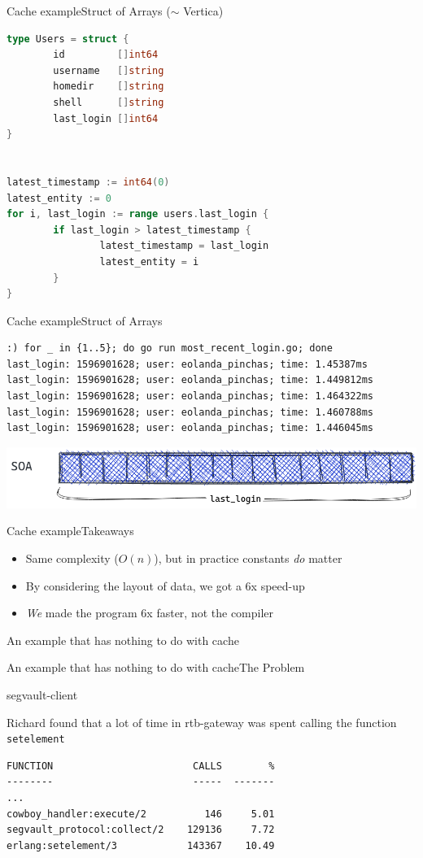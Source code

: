 \documentclass[10pt,xcolor=dvipsnames]{beamer}
\renewcommand\big[1]{
  \begin{center}
    \Large{#1}
  \end{center}
}
\begin{document}
\begin{frame}[fragile]{Cache example}{Struct of Arrays ($\sim$ Vertica)}
  \begin{lstlisting}[language = Go]
type Users = struct {
        id         []int64
        username   []string
        homedir    []string
        shell      []string
        last_login []int64
}


latest_timestamp := int64(0)
latest_entity := 0
for i, last_login := range users.last_login {
        if last_login > latest_timestamp {
                latest_timestamp = last_login
                latest_entity = i
        }
}
\end{lstlisting}
\end{frame}

\begin{frame}[fragile]{Cache example}{Struct of Arrays}
  \begin{lstlisting}
:) for _ in {1..5}; do go run most_recent_login.go; done
last_login: 1596901628; user: eolanda_pinchas; time: 1.45387ms
last_login: 1596901628; user: eolanda_pinchas; time: 1.449812ms
last_login: 1596901628; user: eolanda_pinchas; time: 1.464322ms
last_login: 1596901628; user: eolanda_pinchas; time: 1.460788ms
last_login: 1596901628; user: eolanda_pinchas; time: 1.446045ms
\end{lstlisting}
\vskip 1.5cm
\centering\includegraphics[scale=0.3]{soa.png}
\end{frame}

\begin{frame}{Cache example}{Takeaways}
  \begin{itemize}
    \item Same complexity ($O(n)$), but in practice constants \emph{do} matter
    \item By considering the layout of data, we got a 6x speed-up
    \item \emph{We} made the program 6x faster, not the compiler
  \end{itemize}
\end{frame}

\begin{frame}
  \big{An example that has nothing to do with cache}
\end{frame}

\begin{frame}[t,fragile]{An example that has nothing to do with cache}{The Problem}
  \big{segvault-client}

  Richard found that a lot of time in rtb-gateway was spent calling the function \texttt{setelement}

  \vskip 1cm
  \begin{lstlisting}
FUNCTION                        CALLS        %
--------                        -----  -------
...
cowboy_handler:execute/2          146     5.01
segvault_protocol:collect/2    129136     7.72
erlang:setelement/3            143367    10.49
  \end{lstlisting}
\end{frame}
\end{document}
